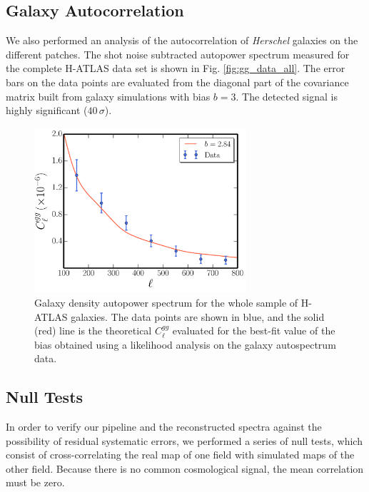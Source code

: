 \subsection{Galaxy Autocorrelation}\label{sec:autocorrxc1}
We also performed an analysis of the autocorrelation of \textit{Herschel} galaxies on the different patches. The shot noise subtracted autopower spectrum measured for the complete H-ATLAS data set is shown in Fig. \eqref{fig:gg_data_all}. The error bars on the data points are evaluated from the diagonal part of the covariance matrix built from galaxy simulations with bias $b=3$. The detected signal is highly significant ($40\,\sigma$).

\begin{figure} %
\centering %
\includegraphics[width=0.7\textwidth]{Chapter3/Images/f12}
\caption{Galaxy density autopower spectrum for the whole sample of H-ATLAS galaxies. The data points are shown in blue, and the solid (red) line is the theoretical $C_{\ell}^{gg}$ evaluated for the best-fit value of the bias obtained using a likelihood analysis on the galaxy autospectrum data.\label{fig:gg_data_all}}
\end{figure}

\subsection{Null Tests}
\label{subsec:null_testsxc1}
In order to verify our pipeline and the reconstructed spectra against the possibility of residual systematic errors, we performed a series of null tests, which consist of cross-correlating the real map of one field with simulated maps of the other field. Because there is no common cosmological signal, the mean correlation must be zero.

